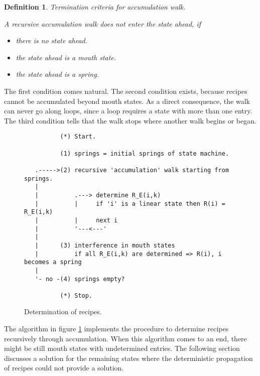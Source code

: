 \documentclass[12pt,a4paper]{scrartcl}
\newtheorem{definition}{Definition}
\begin{document}
\begin{definition}
Termination criteria for accumulation walk.

A recursive accumulation walk does not enter the state ahead, if 

\begin{itemize}
    \item there is no state ahead.
    \item the state ahead is a mouth state.
    \item the state ahead is a spring.
\end{itemize}
\end{definition}

The first condition comes natural. The second condition exists, because recipes
cannot be accumulated beyond mouth states. As a direct consequence, the walk
can never go along loops, since a loop requires a state with more than one
entry. The third condition tells that the walk stops where another walk begins
or began.  

\begin{figure}[htbp] \leavevmode \label{fig:algo-1}
\begin{verbatim}
          (*) Start.
   
          (1) springs = initial springs of state machine.

   .----->(2) recursive 'accumulation' walk starting from springs.
   |
   |          .---> determine R_E(i,k) 
   |          |     if 'i' is a linear state then R(i) = R_E(i,k)
   |          |     next i
   |          '---<---'
   |
   |      (3) interference in mouth states 
   |          if all R_E(i,k) are determined => R(i), i becomes a spring
   |
   '- no -(4) springs empty?

          (*) Stop.
\end{verbatim}

\caption{Determination of recipes.}
\end{figure}

The algorithm in figure \ref{fig:algo-1} implements the procedure to determine
recipes recursively through accumulation.  When this algorithm comes to an end,
there might be still mouth states with undetermined entries.  The following
section discusses a solution for the remaining states where the deterministic
propagation of recipes could not provide a solution.



%
\end{document}
